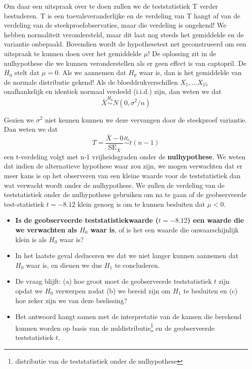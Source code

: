 \documentclass[
  12pt,dutch,coursenotes]{book}
\providecommand{\tightlist}{%
  \setlength{\itemsep}{0pt}\setlength{\parskip}{0pt}}
\theoremstyle{definition}
\theoremstyle{definition}
\theoremstyle{definition}
\theoremstyle{remark}
\begin{document}
Om daar een uitspraak over te doen zullen we de teststatistiek T verder bestuderen.
T is een toevalsveranderlijke en de verdeling van T hangt af van de verdeling van de steekproefobservaties, maar die verdeling is ongekend!
We hebben normaliteit verondersteld, maar dit laat nog steeds het gemiddelde en de variantie onbepaald.
Bovendien wordt de hypothesetest net geconstrueerd om een uitspraak te kunnen doen over het gemiddelde \(\mu\)!
De oplossing zit in de nulhypothese die we kunnen veronderstellen als er geen effect is van captopril.
De \(H_0\) stelt dat \(\mu=0\).
Als we aannemen dat \(H_0\) waar is, dan is het gemiddelde van de normale distributie gekend!
Als de bloeddrukverschillen \(X_1, \ldots X_{15}\) onafhankelijk en identiek normaal verdeeld (i.i.d.) zijn, dan weten we dat
\[\bar X  \stackrel{H_0}{\sim} N(0, \sigma^2/n)\]

Gezien we \(\sigma^2\) niet kennen kunnen we deze vervangen door de steekproef variantie. Dan weten we dat
\[T=\frac{\bar{X}-0}{\text{SE}_{\bar X}}\stackrel{H_0}{\sim} t(n-1) \]
een t-verdeling volgt met n-1 vrijheidsgraden onder de \textbf{nulhypothese}.
We weten dat indien de alternatieve hypothese waar zou zijn, we mogen verwachten dat er meer kans is op het observeren van een kleine waarde voor de teststatistiek dan wat verwacht wordt onder de nulhypothese.
We zullen de verdeling van de teststatistiek onder de nulhypothese gebruiken om na te gaan of de geobserveerde test-statistiek \(t = -8.12\) klein genoeg is om te kunnen besluiten dat \(\mu < 0\).

\begin{itemize}
\tightlist
\item
  \textbf{Is de geobserveerde teststatistiekwaarde (\(t=-8.12\)) een waarde die we verwachten als \(H_0\) waar is}, of is het een waarde die onwaarschijnlijk klein is als \(H_0\) waar is?
\item
  In het laatste geval deduceren we dat we niet langer kunnen aannemen dat \(H_0\) waar is, en dienen we dus \(H_1\) te concluderen.
\item
  De vraag blijft: (a) hoe groot moet de geobserveerde teststatistiek \(t\) zijn opdat we \(H_0\) verwerpen zodat (b) we bereid zijn om \(H_1\) te besluiten en (c) hoe zeker zijn we van deze beslissing?
\item
  Het antwoord hangt samen met de interpretatie van de kansen die berekend kunnen worden op basis van de nuldistributie\footnote{distributie van de teststatistiek onder de nulhypothese} en de geobserveerde teststatistiek \(t\).
\end{itemize}
\end{document}
